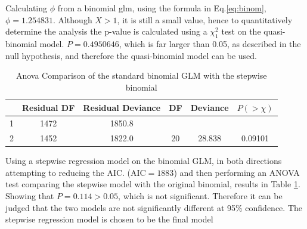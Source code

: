 \documentclass[11pt]{article}
\begin{document}
Calculating $\phi$ from a binomial glm, using the formula in Eq.\ref{eq:binom}, $\phi = 1.254831$. Although $X>1$, it is still a small value, hence to quantitatively determine the analysis the p-value is calculated using a $\chi_1^2$ test on the quasi-binomial model. $P=0.4950646$, which is far larger than 0.05, as described in the null hypothesis, and therefore the quasi-binomial model can be used.

\begin{table}[]
    \centering
    \begin{tabular}{|c|ccccc|}
        \hline
         & Residual DF & Residual Deviance & DF & Deviance & $P(>\chi)$ \\
        \hline
        1 & 1472 & 1850.8 &    &         &         \\
        2 & 1452 & 1822.0 & 20 & 28.838 & 0.09101  \\
        \hline
    \end{tabular}
    \caption{Anova Comparison of the standard binomial GLM with the stepwise binomial}
    \label{tab:anova-2}
\end{table}

Using a stepwise regression model on the binomial GLM, in both directions attempting to reducing the AIC. ($\text{AIC}=1883$) and then performing an ANOVA test comparing the stepwise model with the original binomial, results in Table \ref{tab:anova-2}. Showing that $P=0.114 > 0.05$, which is not significant. Therefore it can be judged that the two models are not significantly different at 95\% confidence. The stepwise regression model is chosen to be the final model 
\end{document}
